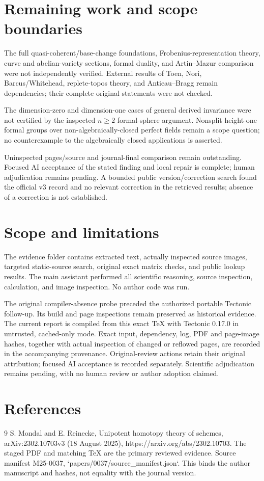 \documentclass[10pt]{article}
\begin{document}
\section*{Remaining work and scope boundaries}
The full quasi-coherent/base-change foundations, Frobenius-representation theory, curve and abelian-variety sections, formal duality, and Artin–Mazur comparison were not independently verified. External results of Toen, Nori, Barcus/Whitehead, replete-topos theory, and Antieau–Bragg remain dependencies; their complete original statements were not checked.\par
The dimension-zero and dimension-one cases of general derived invariance were not certified by the inspected \(n\ge2\) formal-sphere argument. Nonsplit height-one formal groups over non-algebraically-closed perfect fields remain a scope question; no counterexample to the algebraically closed applications is asserted.\par
Uninspected pages/source and journal-final comparison remain outstanding. Focused AI acceptance of the stated finding and local repair is complete; human adjudication remains pending. A bounded public version/correction search found the official v3 record and no relevant correction in the retrieved results; absence of a correction is not established.\par
\section*{Scope and limitations}
The evidence folder contains extracted text, actually inspected source images, targeted static-source search, original exact matrix checks, and public lookup results. The main assistant performed all scientific reasoning, source inspection, calculation, and image inspection. No author code was run.\par
The original compiler-absence probe preceded the authorized portable Tectonic follow-up. Its build and page inspections remain preserved as historical evidence. The current report is compiled from this exact TeX with Tectonic 0.17.0 in untrusted, cached-only mode. Exact input, dependency, log, PDF and page-image hashes, together with actual inspection of changed or reflowed pages, are recorded in the accompanying provenance. Original-review actions retain their original attribution; focused AI acceptance is recorded separately. Scientific adjudication remains pending, with no human review or author adoption claimed.\par
\section*{References}
9 S. Mondal and E. Reinecke, Unipotent homotopy theory of schemes, arXiv:2302.10703v3 (18 August 2025), https://arxiv.org/abs/2302.10703. The staged PDF and matching TeX are the primary reviewed evidence. Source manifest M25-0037, `papers/0037/source\_manifest.json`. This binds the author manuscript and hashes, not equality with the journal version.\par
\end{document}
